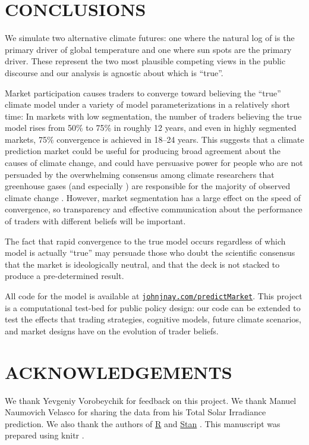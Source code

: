 \documentclass{wscpaperproc}\usepackage[]{graphicx}\usepackage[]{color}
\begin{document}
\section{CONCLUSIONS}

We simulate two alternative climate futures: one where the natural log of  is the primary driver of global temperature and one where sun spots are the primary driver. These represent the two most plausible competing views in the public discourse and our analysis is agnostic about which is ``true''.

Market participation causes traders to converge toward believing the ``true'' climate model under a variety of model parameterizations in a relatively short time: In markets with low segmentation, the number of traders believing the true model rises from 50\% to 75\% in roughly 12 years, and even in highly segmented markets, 75\% convergence is achieved in 18--24 years. This suggests that a climate prediction market could be useful for producing broad agreement about the causes of climate change, and could have persuasive power for people who are not persuaded by the overwhelming consensus among climate researchers that greenhouse gases (and especially ) are responsible for the majority of observed climate change . However, market segmentation has a large effect on the speed of convergence, so transparency and effective communication about the performance of traders with different beliefs will be important.

The fact that rapid convergence to the true model occurs regardless of which model is actually ``true'' may persuade those who doubt the scientific consensus that the market is ideologically neutral, and that the deck is not stacked to produce a pre-determined result.

All code for the model is available at \href{http://johnjnay.com/predictMarket}{\nolinkurl{johnjnay.com/predictMarket}}. This project is a computational test-bed for public policy design: our code can be extended to test the effects that trading strategies, cognitive models, future climate scenarios, and market designs have on the evolution of trader beliefs.

\section*{ACKNOWLEDGEMENTS}

We thank Yevgeniy Vorobeychik for feedback on this project. 
We thank Manuel Naumovich Velasco for sharing the data from his Total Solar Irradiance prediction.
We also thank the authors of \href{http://www.r-project.org}{\textsf{R}} 
and 
\href{http://mc-stan.org}{Stan} .
This manuscript was prepared using 
knitr .
\end{document}
